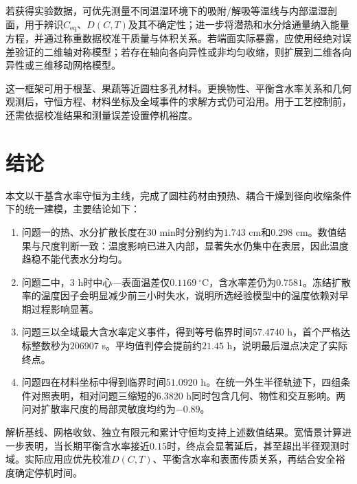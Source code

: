 若获得实验数据，可优先测量不同温湿环境下的吸附/解吸等温线与内部温湿剖面，用于辨识$C_{\mathrm{eq}}$、$D(C,T)$及其不确定性；进一步将潜热和水分焓通量纳入能量方程，并通过称重数据校准干质量与体积关系。若端面实际暴露，应使用经绝对误差验证的二维轴对称模型；若存在轴向各向异性或非均匀收缩，则扩展到二维各向异性或三维移动网格模型。

这一框架可用于根茎、果蔬等近圆柱多孔材料。更换物性、平衡含水率关系和几何观测后，守恒方程、材料坐标及全域事件的求解方式仍可沿用。用于工艺控制前，还需依据校准结果和测量误差设置停机裕度。

\section{结论}

本文以干基含水率守恒为主线，完成了圆柱药材由预热、耦合干燥到径向收缩条件下的统一建模，主要结论如下：

\begin{enumerate}[label=\arabic*)]
  \item 问题一的热、水分扩散长度在30 min时分别约为$1.743$ cm和$0.298$ cm。数值结果与尺度判断一致：温度影响已进入内部，显著失水仍集中在表层，因此温度趋稳不能代表水分均匀。
  \item 问题二中，3 h时中心---表面温差仅$0.1169\ ^\circ\mathrm C$，含水率差仍为$0.7581$。冻结扩散率的温度因子会明显减少前三小时失水，说明所选经验模型中的温度依赖对早期过程影响显著。
  \item 问题三以全域最大含水率定义事件，得到等号临界时间$57.4740$ h，首个严格达标整数秒为$206907$ s。平均值判停会提前约$21.45$ h，说明最后湿点决定了实际终点。
  \item 问题四在材料坐标中得到临界时间$51.0920$ h。在统一外生半径轨迹下，四组条件对照表明，相对问题三缩短的$6.3820$ h同时包含几何、物性和交互影响。两问对扩散率尺度的局部灵敏度均约为$-0.89$。
\end{enumerate}

解析基线、网格收敛、独立有限元和累计守恒均支持上述数值结果。宽情景计算进一步表明，当长期平衡含水率接近$0.15$时，终点会显著延后，甚至超出半径观测时域。实际应用应优先校准$D(C,T)$、平衡含水率和表面传质关系，再结合安全裕度确定停机时间。

